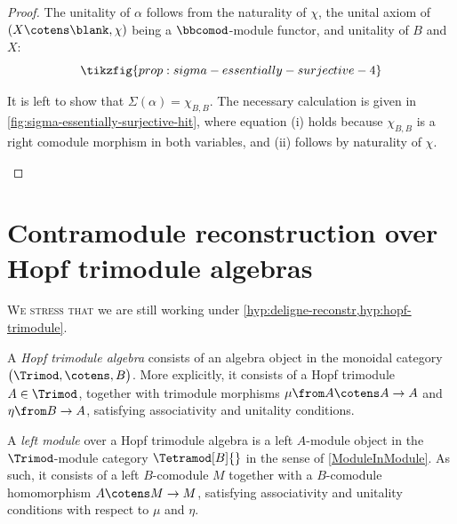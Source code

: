 \begin{proof}
  The unitality of \(\alpha\) follows from the naturality of \(\chi\),
  the unital axiom of \((X \cotens \blank, \chi)\) being a \(\bbcomod\)\hyp{}module functor,
  and unitality of \(B\) and \(X\):
  \[
    \tikzfig{prop:sigma-essentially-surjective-4}
  \]

  It is left to show that \(\Sigma(\alpha) = \chi_{B,B}\).
  The necessary calculation is given in \cref{fig:sigma-essentially-surjective-hit},
  where equation (i) holds because \(\chi_{B,B}\) is a right comodule morphism in both variables,
  and (ii) follows by naturality of \(\chi\).
  \begin{figure}[hbtp]
    \centering
    \vspace{-\onelineskip}%
  \end{figure}
\end{proof}

\section{Contramodule reconstruction over Hopf trimodule algebras}\label{triconstruction}

\textsc{We stress that}
we are still working under \cref{hyp:deligne-reconstr,hyp:hopf-trimodule}.

\begin{definition}\label{def:hopf-trimodule-algebra}
  A \emph{Hopf trimodule algebra} consists of an algebra object in the monoidal category \(\big(\Trimod, \cotens, B\big)\).
  More explicitly, it consists of a Hopf trimodule \(A \in \Trimod\),
  together with trimodule morphisms \(\mu \from A \cotens A \to A\) and \(\eta \from B \to A\),
  satisfying associativity and unitality conditions.
\end{definition}

\begin{definition}\label{def:module-over-hopf-trimodule-algebra}
  A \emph{left module} over a Hopf trimodule algebra
  is a left \(A\)\hyp{}module object in the \(\Trimod\)\hyp{}module category \(\Tetramod[B]{}\)
  in the sense of \cref{ModuleInModule}.
  As such, it consists of a left \(B\)\hyp{}comodule \(M\)
  together with a \(B\)\hyp{}comodule homomorphism \(A \cotens M \to M\),
  satisfying associativity and unitality conditions with respect to \(\mu\) and \(\eta\).
\end{definition}

